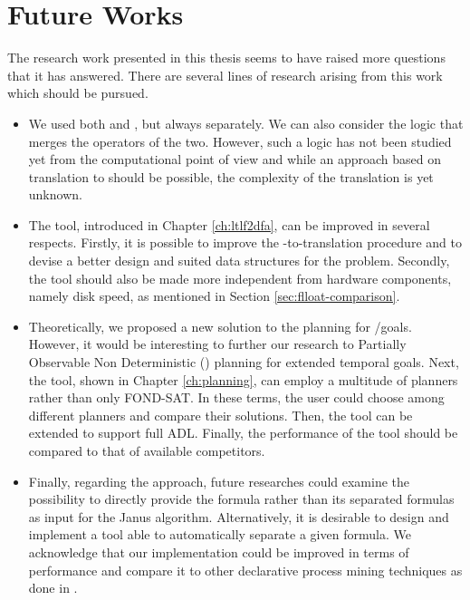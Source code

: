\section{Future Works}
The research work presented in this thesis seems to have raised more questions that it has answered. There are several lines of research arising from this work which should be pursued.

\begin{itemize}
\item We used both \LTLf and \PLTL, but always separately. We can also consider the \LTLp logic that merges the operators of the two. However, such a logic has not been studied yet from the computational point of view and while an approach based on translation to \DFAs should be possible, the complexity of the translation is yet unknown.


\item The \LTLfToDFA tool, introduced in Chapter \ref{ch:ltlf2dfa}, can be improved in several respects. Firstly, it is possible to improve the \LTLf-to-\FOL translation procedure and to devise a better design and suited data structures for the problem. Secondly, the \LTLfToDFA tool should also be made more independent from hardware components, namely disk speed, as mentioned in Section \ref{sec:flloat-comparison}.

\item Theoretically, we proposed a new solution to the \FOND planning for \LTLf/\PLTL goals. However, it would be interesting to further our research to Partially Observable Non Deterministic (\POND) planning for extended temporal goals. Next, the \FONDFOR tool, shown in Chapter \ref{ch:planning}, can employ a multitude of planners rather than only FOND-SAT. In these terms, the user could choose among different planners and compare their solutions. Then, the \FONDFOR tool can be extended to support full ADL. Finally, the performance of the \FONDFOR tool should be compared to that of available competitors.

\item Finally, regarding the \janus approach, future researches could examine the possibility to directly provide the \LTLp formula rather than its separated formulas as input for the Janus algorithm. Alternatively, it is desirable to design and implement a tool able to automatically separate a given \LTLp formula. We acknowledge that our \janus implementation could be improved in terms of performance and compare it to other declarative process mining techniques as done in \cite{cecconi2018interestingness}.
\end{itemize}
